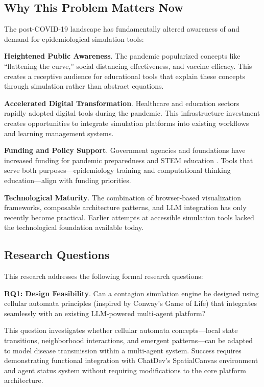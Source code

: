 \subsection{Why This Problem Matters Now}

The post-COVID-19 landscape has fundamentally altered awareness of and demand for epidemiological simulation tools:

\textbf{Heightened Public Awareness}. The pandemic popularized concepts like ``flattening the curve,'' social distancing effectiveness, and vaccine efficacy. This creates a receptive audience for educational tools that explain these concepts through simulation rather than abstract equations.

\textbf{Accelerated Digital Transformation}. Healthcare and education sectors rapidly adopted digital tools during the pandemic. This infrastructure investment creates opportunities to integrate simulation platforms into existing workflows and learning management systems.

\textbf{Funding and Policy Support}. Government agencies and foundations have increased funding for pandemic preparedness and STEM education \cite{nih2021pandemic}. Tools that serve both purposes---epidemiology training and computational thinking education---align with funding priorities.

\textbf{Technological Maturity}. The combination of browser-based visualization frameworks, composable architecture patterns, and LLM integration has only recently become practical. Earlier attempts at accessible simulation tools lacked the technological foundation available today.

\subsection{Research Questions}

This research addresses the following formal research questions:

\textbf{RQ1: Design Feasibility}. Can a contagion simulation engine be designed using cellular automata principles (inspired by Conway's Game of Life) that integrates seamlessly with an existing LLM-powered multi-agent platform?

This question investigates whether cellular automata concepts---local state transitions, neighborhood interactions, and emergent patterns---can be adapted to model disease transmission within a multi-agent system. Success requires demonstrating functional integration with ChatDev's SpatialCanvas environment and agent status system without requiring modifications to the core platform architecture.

